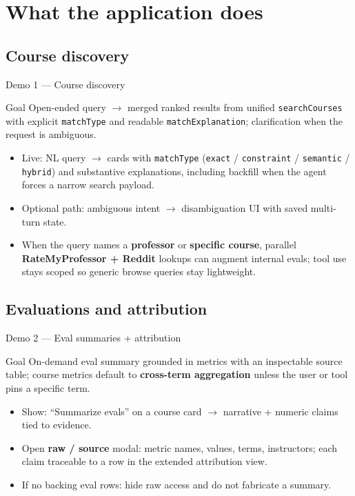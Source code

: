 \documentclass[10pt,compress,english]{beamer}
\begin{document}
\section{What the application does}

\subsection{Course discovery}

\begin{frame}{Demo 1 --- Course discovery}
  \begin{block}{Goal}
    Open-ended query $\rightarrow$ merged ranked results from unified \texttt{searchCourses} with explicit \texttt{matchType} and readable \texttt{matchExplanation}; clarification when the request is ambiguous.
  \end{block}
  \begin{itemize}\setlength\itemsep{0.22em}
    \item Live: NL query $\rightarrow$ cards with \texttt{matchType} (\texttt{exact} / \texttt{constraint} / \texttt{semantic} / \texttt{hybrid}) and substantive explanations, including backfill when the agent forces a narrow search payload.
    \item Optional path: ambiguous intent $\rightarrow$ disambiguation UI with saved multi-turn state.
    \item When the query names a \textbf{professor} or \textbf{specific course}, parallel \textbf{RateMyProfessor + Reddit} lookups can augment internal evals; tool use stays scoped so generic browse queries stay lightweight.
  \end{itemize}
\end{frame}

\subsection{Evaluations and attribution}

\begin{frame}{Demo 2 --- Eval summaries + attribution}
  \begin{block}{Goal}
    On-demand eval summary grounded in metrics with an inspectable source table; course metrics default to \textbf{cross-term aggregation} unless the user or tool pins a specific term.
  \end{block}
  \begin{itemize}\setlength\itemsep{0.22em}
    \item Show: ``Summarize evals'' on a course card $\rightarrow$ narrative + numeric claims tied to evidence.
    \item Open \textbf{raw / source} modal: metric names, values, terms, instructors; each claim traceable to a row in the extended attribution view.
    \item If no backing eval rows: hide raw access and do not fabricate a summary.
  \end{itemize}
\end{frame}
\end{document}
